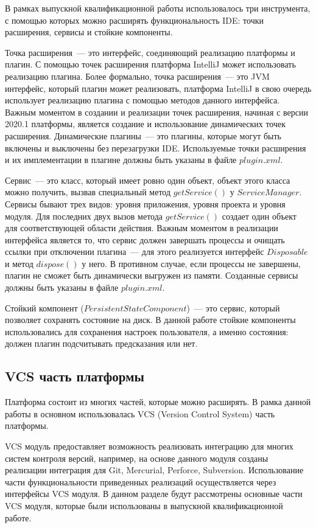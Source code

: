 В рамках выпускной квалификационной работы использовалось три инструмента, с помощью которых можно расширять функциональность IDE: точки расширения, сервисы и стойкие компоненты.

Точка расширения~--- это интерфейс, соединяющий реализацию платформы и плагин. С помощью точек расширения платформа IntelliJ может использовать реализацию плагина. Более формально, точка расширения~--- это JVM интерфейс, который плагин может реализовать, платформа IntelliJ в свою очередь использует реализацию плагина с помощью методов данного интерфейса. Важным моментом в создании и реализации точек расширения, начиная с версии 2020.1 платформы, является создание и использование динамических точек расширения. Динамические плагины~--- это плагины, которые могут быть включены и выключены без перезагрузки IDE. Используемые точки расширения и их имплементации в плагине должны быть указаны в файле $plugin.xml$.

Сервис~--- это класс, который имеет ровно один объект, объект этого класса можно получить, вызвав специальный метод $getService()$ у $ServiceManager$. Сервисы бывают трех видов: уровня приложения, уровня проекта и уровня модуля. Для последних двух вызов метода $getService()$ создает один объект для соответствующей области действия. Важным моментом в реализации интерфейса является то, что сервис должен завершать процессы и очищать ссылки при отключении плагина~--- для этого реализуется интерфейс $Disposable$ и метод $dispose()$ у него. В противном случае, если процессы не завершены, плагин не сможет быть динамически выгружен из памяти. Созданные сервисы должны быть указаны в файле $plugin.xml$.

Стойкий компонент ($PersistentStateComponent$)~--- это сервис, который позволяет сохранять состояние на диск. В данной работе стойкие компоненты использовались для сохранения настроек пользователя, а именно состояния: должен плагин подсчитывать предсказания или нет.
    \subsection{VCS часть платформы}\label{chapter2-vcs}
Платформа состоит из многих частей, которые можно расширять. В рамка данной работы в основном использовалась VCS (Version Control System) часть платформы.

VCS модуль предоставляет возможность реализовать интеграцию для многих систем контроля версий, например, на основе данного модуля созданы реализации интеграция для Git, Mercurial, Perforce, Subversion. Использование части функциональности приведенных реализаций осуществляется через интерфейсы VCS модуля. В данном разделе будут рассмотрены основные части VCS модуля, которые были использованы в выпускной квалификационной работе.

